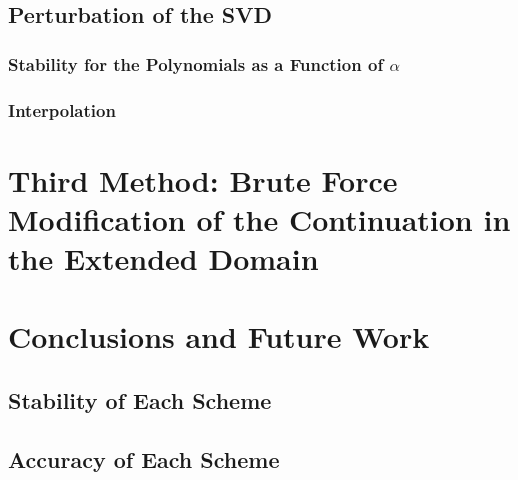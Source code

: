 \documentclass[11pt]{amsart}
\begin{document}
\subsection{Perturbation of the SVD}
 
\subsubsection{Stability for the Polynomials as a Function of $\alpha$}
%
%
%
\subsubsection{Interpolation}
%
%
%
\section{Third Method: Brute Force Modification of the Continuation in the Extended Domain}


\section{Conclusions and Future Work}
\subsection{Stability of Each Scheme}
\subsection{Accuracy of Each Scheme}
%
%
%
\end{document}
